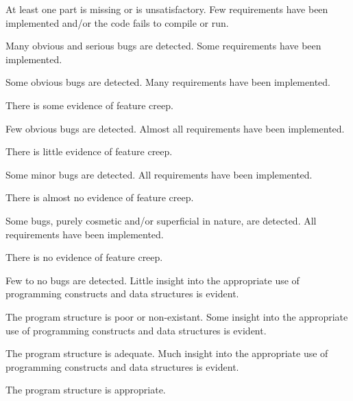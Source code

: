 \documentclass{../../fal_assignment}
\begin{document}
\rubrichead{\ }
\begin{markingrubric}
		\grade\fail At least one part is missing or is unsatisfactory.
%
        \grade \fail Few requirements have been implemented  and/or the code fails to compile or run.
            \par Many obvious and serious bugs are detected.
        \grade Some requirements have been implemented.
            \par Some obvious bugs are detected.
        \grade Many requirements have been implemented.
            \par There is some evidence of feature creep.
            \par Few obvious bugs  are detected.
        \grade Almost all requirements have been implemented.
            \par There is little evidence of feature creep.
            \par Some minor bugs  are detected.
        \grade All requirements have been implemented.
            \par There is almost no evidence of feature creep.
            \par Some bugs, purely cosmetic and/or superficial in nature, are detected.
        \grade All requirements have been implemented.
            \par There is no evidence of feature creep.
            \par Few to no bugs are detected.
%
        \grade \fail Little insight into the appropriate use of programming constructs and data structures is evident.
            \par The program structure is poor or non-existant.
        \grade Some insight into the appropriate use of programming constructs and data structures is evident.
            \par The program structure is adequate.
        \grade Much insight into the appropriate use of programming constructs and data structures is evident.
            \par The program structure is appropriate.

\end{markingrubric}
\end{document}
